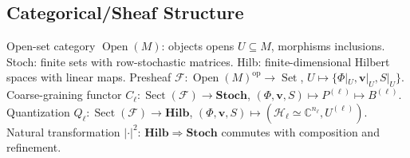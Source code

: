 \documentclass[11pt]{article}
\theoremstyle{plain}
\theoremstyle{definition}
\begin{document}
\subsection{Categorical/Sheaf Structure}
Open-set category $\operatorname{Open}(M)$: objects opens $U \subseteq M$, morphisms inclusions.
Stoch: finite sets with row-stochastic matrices.
Hilb: finite-dimensional Hilbert spaces with linear maps.
Presheaf $\mathcal{F}: \operatorname{Open}(M)^{\mathrm{op}} \to \operatorname{Set}$, $U \mapsto \{\Phi|_U, \bm{v}|_U, S|_U\}$.
Coarse-graining functor $C_\ell: \operatorname{Sect}(\mathcal{F}) \to \mathbf{Stoch}$, $(\Phi, \bm{v}, S) \mapsto P^{(\ell)} \mapsto B^{(\ell)}$.
Quantization $Q_\ell: \operatorname{Sect}(\mathcal{F}) \to \mathbf{Hilb}$, $(\Phi, \bm{v}, S) \mapsto (\mathcal{H}_\ell \simeq \mathbb{C}^{n_\ell}, U^{(\ell)})$.
Natural transformation \texorpdfstring{$|\cdot|^2$}{mod-square}: $\mathbf{Hilb} \Rightarrow \mathbf{Stoch}$ commutes with composition and refinement.

\newpage


\end{document}
